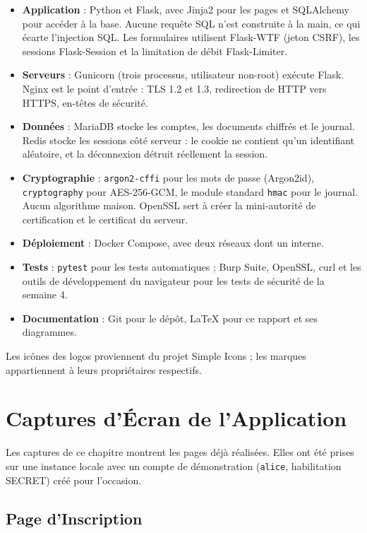 \documentclass[12pt,a4paper]{report}
\newcommand{\code}[1]{\texttt{\NoAutoSpacing #1}}
\begin{document}
\begin{itemize}
  \item \textbf{Application} : Python et Flask, avec Jinja2 pour les pages et SQLAlchemy pour accéder à la base. Aucune requête SQL n'est construite à la main, ce qui écarte l'injection SQL. Les formulaires utilisent Flask-WTF (jeton CSRF), les sessions Flask-Session et la limitation de débit Flask-Limiter.
  \item \textbf{Serveurs} : Gunicorn (trois processus, utilisateur non-root) exécute Flask. Nginx est le point d'entrée : TLS 1.2 et 1.3, redirection de HTTP vers HTTPS, en-têtes de sécurité.
  \item \textbf{Données} : MariaDB stocke les comptes, les documents chiffrés et le journal. Redis stocke les sessions côté serveur : le cookie ne contient qu'un identifiant aléatoire, et la déconnexion détruit réellement la session.
  \item \textbf{Cryptographie} : \code{argon2-cffi} pour les mots de passe (Argon2id), \code{cryptography} pour AES-256-GCM, le module standard \code{hmac} pour le journal. Aucun algorithme maison. OpenSSL sert à créer la mini-autorité de certification et le certificat du serveur.
  \item \textbf{Déploiement} : Docker Compose, avec deux réseaux dont un interne.
  \item \textbf{Tests} : \code{pytest} pour les tests automatiques ; Burp Suite, OpenSSL, curl et les outils de développement du navigateur pour les tests de sécurité de la semaine 4.
  \item \textbf{Documentation} : Git pour le dépôt, \LaTeX{} pour ce rapport et ses diagrammes.
\end{itemize}

Les icônes des logos proviennent du projet Simple Icons ; les marques appartiennent à leurs propriétaires respectifs.

\chapter{Captures d'Écran de l'Application}

Les captures de ce chapitre montrent les pages déjà réalisées. Elles ont été prises sur une instance locale avec un compte de démonstration (\code{alice}, habilitation SECRET) créé pour l'occasion.

\section{Page d'Inscription}
\end{document}
